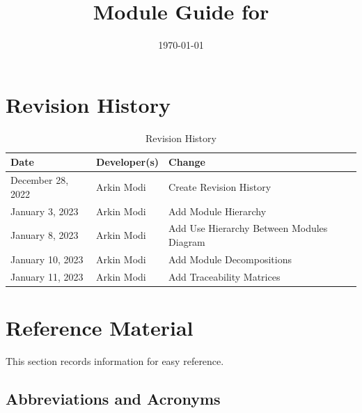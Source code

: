\documentclass[12pt, titlepage]{article}
\begin{document}
\title{Module Guide for \progname{}}
\author{\authname}
\date{\today}

\maketitle


\section{Revision History}

\begin{table}[hp]
	\caption{Revision History} \label{TblRevisionHistory}
	\begin{tabularx}{\textwidth}{llX}
		\toprule
		\textbf{Date}     & \textbf{Developer(s)} & \textbf{Change}                           \\
		\midrule
		December 28, 2022 & Arkin Modi            & Create Revision History                   \\
		January 3, 2023   & Arkin Modi            & Add Module Hierarchy                      \\
		January 8, 2023   & Arkin Modi            & Add Use Hierarchy Between Modules Diagram \\
		January 10, 2023  & Arkin Modi            & Add Module Decompositions                 \\
		January 11, 2023  & Arkin Modi            & Add Traceability Matrices                 \\
		\bottomrule
	\end{tabularx}
\end{table}

\newpage

\section{Reference Material}

This section records information for easy reference.

\subsection{Abbreviations and Acronyms}
\end{document}
